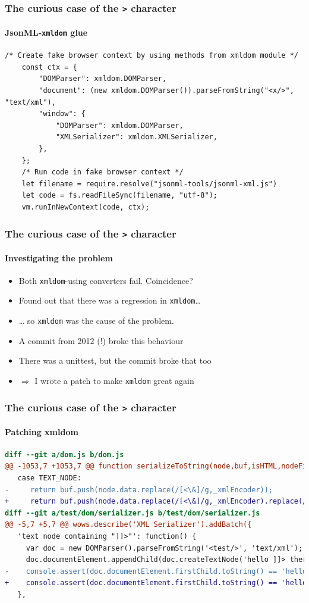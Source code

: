 \documentclass[
    alternativetitlepage=alternativ,
    cornerlogo=hgi_nds_logo2,
    sectionoverview,
]{rubpresentation}
\begin{document}
\begin{frame}[fragile]
    \frametitle{The curious case of the \texttt{>} character}
    \framesubtitle{JsonML-\texttt{xmldom} glue}
    \begin{lstlisting}[basicstyle=\fontsize{7}{11}\ttfamily,numbers=none]
    /* Create fake browser context by using methods from xmldom module */
    const ctx = {
        "DOMParser": xmldom.DOMParser,
        "document": (new xmldom.DOMParser()).parseFromString("<x/>", "text/xml"),
        "window": {
            "DOMParser": xmldom.DOMParser,
            "XMLSerializer": xmldom.XMLSerializer,
        },
    };
    /* Run code in fake browser context */
    let filename = require.resolve("jsonml-tools/jsonml-xml.js")
    let code = fs.readFileSync(filename, "utf-8");
    vm.runInNewContext(code, ctx);
    \end{lstlisting}
\end{frame}

\begin{frame}
    \frametitle{The curious case of the \texttt{>} character}
    \framesubtitle{Investigating the problem}
    \begin{itemize}
        \item{} Both \texttt{xmldom}-using converters fail. Coincidence?
        \item{} Found out that there was a regression in \texttt{xmldom}\dots{}
        \item{} \dots{} so \texttt{xmldom} was the cause of the problem.
        \item{} A commit from 2012 (!) broke this behaviour
        \item{} There was a unittest, but the commit broke that too
        \item{} $\Rightarrow$ I wrote a patch to make \texttt{xmldom} great again
    \end{itemize}
\end{frame}

\begin{frame}[fragile]
    \frametitle{The curious case of the \texttt{>} character}
    \framesubtitle{Patching xmldom}
    \begin{lstlisting}[language=diff,basicstyle=\fontsize{7}{11}\ttfamily,numbers=none]
diff --git a/dom.js b/dom.js
@@ -1053,7 +1053,7 @@ function serializeToString(node,buf,isHTML,nodeFilter,visibleNamespaces){
   case TEXT_NODE:
-     return buf.push(node.data.replace(/[<\&]/g,_xmlEncoder));
+     return buf.push(node.data.replace(/[<\&]/g,_xmlEncoder).replace(/\]\]>/g,']]'+_xmlEncoder('>')));
diff --git a/test/dom/serializer.js b/test/dom/serializer.js
@@ -5,7 +5,7 @@ wows.describe('XML Serializer').addBatch({
   'text node containing "]]>"': function() {
     var doc = new DOMParser().parseFromString('<test/>', 'text/xml');
     doc.documentElement.appendChild(doc.createTextNode('hello ]]> there'));
-    console.assert(doc.documentElement.firstChild.toString() == 'hello ]]> there',doc.documentElement.firstChild.toString());
+    console.assert(doc.documentElement.firstChild.toString() == 'hello ]]\&gt; there',doc.documentElement.firstChild.toString());
   },
    \end{lstlisting}
\end{frame}
\end{document}
